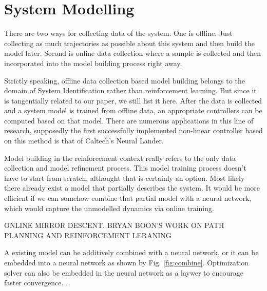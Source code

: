 \documentclass[journal]{IEEEtran}
\begin{document}
\section{System Modelling}

There are two ways for collecting data of the system. One is offline. Just collecting as much trajectories as possible about this system and then build the model later. Second is online data collection where a sample is collected and then incorporated into the model building process right away.

Strictly speaking, offline data collection based model building belongs to the domain of System Identification rather than reinforcement learning. But since it is tangentially related to our paper, we still list it here. After the data is collected and a system model is trained from offline data, an appropriate controllers can be computed based on that model. There are numerous applications in this line of research, supposedly the first successfully implemented non-linear controller based on this method is that of Caltech's Neural Lander. \cite{Shi2019NeuralLS}

Model building in the reinforcement context really refers to the only data collection and model refinement process. This model training process doesn't have to start from scratch, althought that is certainly an option. Most likely there already exist a model that partially describes the system. It would be more efficient if we can somehow combine that partial model with a neural network, which would capture the unmodelled dynamics via online training.

ONLINE MIRROR DESCENT. BRYAN BOON'S WORK ON PATH PLANNING AND REINFORCEMENT LERANING

A existing model can be additively combined \cite{Hewing2020LearningBasedMP} with a neural network, or it can be embedded into a neural network \cite{Mohan2020EmbeddingHP} as shown by Fig. \ref{fig:combine}. Optimization solver can also be embedded in the neural network as a laywer to encourage faster convergence. \cite{BelbutePeres2018EndtoEndDP} \cite{BelbutePeres2020CombiningDP} \cite{Agrawal2019DifferentiableCO}.
\end{document}
